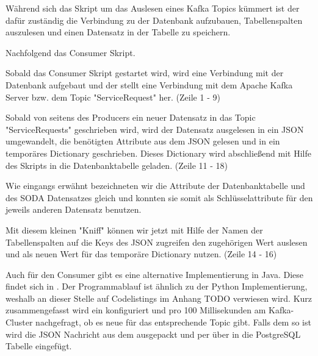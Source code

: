 Während sich das  Skript um das Auslesen eines Kafka Topics kümmert ist der 
dafür zuständig die Verbindung zu der Datenbank aufzubauen, Tabellenspalten auszulesen und einen Datensatz in der Tabelle zu speichern.

Nachfolgend das Consumer Skript.



Sobald das Consumer Skript gestartet wird, wird eine Verbindung mit der Datenbank
aufgebaut und der  stellt eine Verbindung mit dem Apache Kafka
Server bzw. dem Topic "ServiceRequest" her.
(Zeile 1 - 9)

Sobald von seitens des Producers ein neuer Datensatz in das Topic "ServiceRequests" geschrieben wird,
wird der Datensatz ausgelesen in ein \ac{JSON} umgewandelt, die benötigten Attribute aus dem \ac{JSON} gelesen
und in ein temporäres Dictionary geschrieben.
Dieses Dictionary wird abschließend mit Hilfe des  Skripts in die
Datenbanktabelle geladen.
(Zeile 11 - 18)

Wie eingangs erwähnt bezeichneten wir die Attribute der Datenbanktabelle und des \ac{SODA} Datensatzes gleich
und konnten sie somit als Schlüsselattribute für den jeweils anderen Datensatz benutzen.

Mit diesem kleinen "Kniff" können wir jetzt mit Hilfe der Namen der Tabellenspalten
auf die Keys des \ac{JSON} zugreifen den zugehörigen Wert auslesen und als neuen Wert für das temporäre Dictionary nutzen.
(Zeile 14 - 16)

Auch für den Consumer gibt es eine alternative Implementierung in Java. Diese findet sich in .
Der Programmablauf ist ähnlich zu der Python Implementierung, weshalb an dieser Stelle auf Codelistings im Anhang TODO verwiesen wird.
Kurz zusammengefasst wird ein  konfiguriert und pro 100 Millisekunden am Kafka-Cluster nachgefragt, ob es neue  für das entsprechende Topic gibt.
Falls dem so ist wird die \ac{JSON} Nachricht aus dem  ausgepackt und per  über  in die PostgreSQL Tabelle eingefügt.
